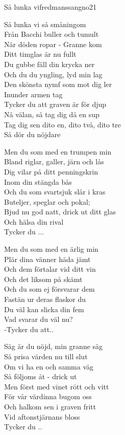 \begin{song}{Så lunka vi}{fredmanssangno21}
\begin{vers}
Så lunka vi så småningom \\
Från Bacchi buller och tumult\\
När döden ropar - Granne kom\\
Ditt timglas är nu fullt\\
Du gubbe fäll din krycka ner\\
Och du du yngling, lyd min lag\\
Den skönsta nymf som mot dig ler\\
Inunder armen tag\\
Tycker du att graven är för djup\\
Nå välan, så tag dig då en sup\\
Tag dig sen dito en, dito två, dito tre\\
Så dör du nöjdare\\
\end{vers}
\begin{vers}
Men du som med en trumpen min\\
Bland riglar, galler, järn och lås\\
Dig vilar på ditt penningskrin\\
Inom din stängda bås\\
Och du som svartsjuk slår i kras\\
Buteljer, speglar och pokal;\\
Bjud nu god natt, drick ut ditt glas\\
Och hälsa din rival\\
Tycker du ...\\
\end{vers}
\newp
\begin{vers}
Men du som med en ärlig min\\
Plär dina vänner häda jämt\\
Och dem förtalar vid ditt vin\\
Och det liksom på skämt\\
Och du som ej försvarar dem\\
Fastän ur deras flaskor du\\
Du väl kan slicka din fem\\
Vad svarar du väl nu?\\
-Tycker du att..\\
\end{vers}
\begin{vers}
Säg är du nöjd, min granne säg\\
Så prisa värden nu till slut\\
Om vi ha en och samma väg\\
Så följoms åt - drick ut\\
Men först med vinet rött och vitt\\
För vår värdinna bugom oss\\
Och halkom sen i graven fritt\\
Vid aftonstjärnans bloss\\
Tycker du ..\\
\end{vers}
\end{song}
